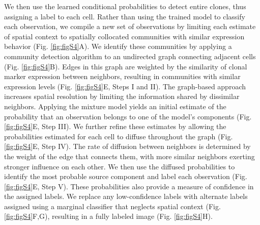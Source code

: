 We then use the learned conditional probabilities to detect entire clones, thus assigning a label to each cell. Rather than using the trained model to classify each observation, we compile a new set of observations by limiting each estimate of spatial context to spatially collocated communities with similar expression behavior (Fig. \ref{fig:figS4}A). We identify these communities by applying a community detection algorithm to an undirected graph connecting adjacent cells (Fig. \ref{fig:figS4}B). Edges in this graph are weighted by the similarity of clonal marker expression between neighbors, resulting in communities with similar expression levels (Fig. \ref{fig:figS4}E, Steps I and II). The graph-based approach increases spatial resolution by limiting the information shared by dissimilar neighbors. Applying the mixture model yields an initial estimate of the probability that an observation belongs to one of the model's components (Fig. \ref{fig:figS4}E, Step III). We further refine these estimates by allowing the probabilities estimated for each cell to diffuse throughout the graph (Fig. \ref{fig:figS4}E, Step IV). The rate of diffusion between neighbors is determined by the weight of the edge that connects them, with more similar neighbors exerting stronger influence on each other. We then use the diffused probabilities to identify the most probable source component and label each observation (Fig. \ref{fig:figS4}E, Step V). These probabilities also provide a measure of confidence in the assigned labels. We replace any low-confidence labels with alternate labels assigned using a marginal classifier that neglects spatial context (Fig. \ref{fig:figS4}F,G), resulting in a fully labeled image (Fig. \ref{fig:figS4}H).

